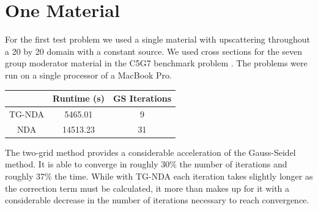 \section{One Material}
For the first test problem we used a single material with  upscattering throughout a 20 by 20 domain with a constant source. We used cross sections for the seven group moderator material in the C5G7 benchmark problem \cite{C5G7}.  
The problems were run on a single processor of a MacBook Pro. 
\begin{center}
    \begin{tabular}{|c|c|c|}
    \hline
    & Runtime (s) & GS Iterations \\
    \hline
    TG-NDA & 5465.01 & 9 \\
    NDA & 14513.23 & 31 \\
    \hline
    \end{tabular}
\end{center}
The two-grid method provides a considerable acceleration of the Gauss-Seidel method. It is able to converge in roughly 30\% the number of iterations and roughly 37\% the time.  While with TG-NDA each iteration takes slightly longer as the correction term must be calculated, it more than makes up for it with a considerable decrease in the number of iterations necessary to reach convergence. 

